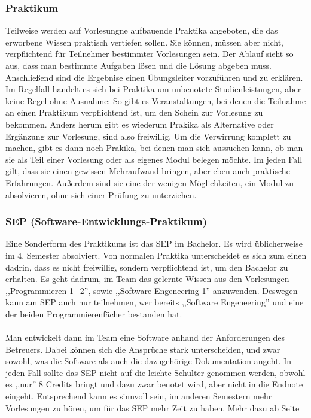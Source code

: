 \begin{multicols}{2}
\subsubsection*{Praktikum}
Teilweise werden auf Vorlesungne aufbauende Praktika angeboten, die
das erworbene Wissen praktisch vertiefen sollen. Sie können, müssen aber nicht,
verpflichtend für Teilnehmer bestimmter Vorlesungen sein. Der Ablauf
sieht so aus, dass man bestimmte Aufgaben lösen und die Lösung abgeben
muss. Anschließend sind die Ergebnise einen Übungsleiter vorzuführen
und zu erklären. Im Regelfall handelt es sich bei Praktika um
unbenotete Studienleistungen, aber keine Regel ohne Ausnahme: So gibt
es Veranstaltungen, bei denen die Teilnahme an einen Praktikum
verpflichtend ist, um den Schein zur Vorlesung zu bekommen. Anders
herum gibt es wiederum Prakika als Alternative oder Ergänzung zur
Vorlesung, sind also freiwillig. Um die Verwirrung komplett zu machen,
gibt es dann noch Prakika, bei denen man sich aussuchen kann, ob man
sie als Teil einer Vorlesung oder als eigenes Modul belegen möchte. Im
jeden Fall gilt, dass sie einen gewissen Mehraufwand bringen, aber
eben auch praktische Erfahrungen. Außerdem sind sie eine der wenigen
Möglichkeiten, ein Modul zu absolvieren, ohne sich einer Prüfung zu
unterziehen.

\subsubsection*{SEP (Software-Entwicklungs-Praktikum)}
Eine Sonderform des Praktikums ist das SEP im Bachelor. Es wird
üblicherweise im 4. Semester absolviert. Von normalen Praktika
unterscheidet es sich zum einen dadrin, dass es nicht freiwillig,
sondern verpflichtend ist, um den Bachelor zu erhalten. Es geht
dadrum, im Team das gelernte Wissen aus den Vorlesungen
,,Programmieren 1+2'', sowie ,,Software Engeneering 1''
anzuwenden. Deswegen kann am SEP auch nur teilnehmen, wer bereits
,,Software Engeneering'' und eine der beiden Programmierenfächer
bestanden hat.\\\\
Man entwickelt dann im Team eine Software anhand der Anforderungen des
Betreuers. Dabei können sich die Ansprüche stark unterscheiden, und
zwar sowohl, was die Software als auch die dazugehörige Dokumentation
angeht. In jeden Fall sollte das SEP nicht auf die leichte Schulter
genommen werden, obwohl es ,,nur'' 8 Credits bringt und dazu zwar
benotet wird, aber nicht in die Endnote eingeht. Entsprechend kann es
sinnvoll sein, im anderen Semestern mehr Vorlesungen zu hören, um für
das SEP mehr Zeit zu haben. Mehr dazu ab Seite \pageref{bach_studienplan}


\end{multicols}
